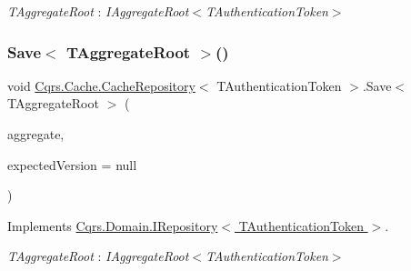 \begin{Desc}
\item[Type Constraints]\begin{description}
\item[{\em T\+Aggregate\+Root} : {\em I\+Aggregate\+Root$<$T\+Authentication\+Token$>$}]\end{description}
\end{Desc}
\mbox{\label{classCqrs_1_1Cache_1_1CacheRepository_a1c4bbe08b2a21523a4871d9a2f484ee6}} 
\subsubsection{\texorpdfstring{Save$<$ T\+Aggregate\+Root $>$()}{Save< TAggregateRoot >()}}
{\footnotesize\ttfamily void \hyperlink{classCqrs_1_1Cache_1_1CacheRepository}{Cqrs.\+Cache.\+Cache\+Repository}$<$ T\+Authentication\+Token $>$.Save$<$ T\+Aggregate\+Root $>$ (\begin{DoxyParamCaption}\item[{T\+Aggregate\+Root}]{aggregate,  }\item[{int?}]{expected\+Version = {\ttfamily null} }\end{DoxyParamCaption})}



Implements \hyperlink{interfaceCqrs_1_1Domain_1_1IRepository_a6086f15a0fef4982da553d24aee04015}{Cqrs.\+Domain.\+I\+Repository$<$ T\+Authentication\+Token $>$}.

\begin{Desc}
\item[Type Constraints]\begin{description}
\item[{\em T\+Aggregate\+Root} : {\em I\+Aggregate\+Root$<$T\+Authentication\+Token$>$}]\end{description}
\end{Desc}
